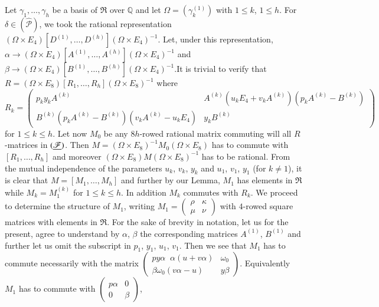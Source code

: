 Let $\gamma_{1},\ldots, \gamma_{h}$ be a basis of $\mathfrak{R}$ over
$\mathbb{Q}$ and let $\Omega=(\gamma^{(1)}_{k})$ with $1\leq k$,
$1\leq h$. For $\delta\in(\widehat{\mathscr{P}})$, we took the
rational representation $(\Omega\times
E_{4})[D^{(1)},\ldots,D^{(h)}](\Omega\times E_{4})^{-1}$. Let, under
this representation, $\alpha\to(\Omega\times
E_{4})[A^{(1)},\ldots,A^{(h)}](\Omega\times E_{4})^{-1}$ and 
$\beta\to (\Omega\times E_{4})[B^{(1)},\ldots,B^{(h)}](\Omega\times
E_{4})^{-1}$.\pageoriginale It is trivial to verify that $R=(\Omega\times
E_{8})[R_{1},\ldots,R_{h}](\Omega\times E_{8})^{-1}$ where
{\fontsize{10}{12}\selectfont
$$
R_{k}=
\begin{pmatrix}
p_{k}y_{k}A^{(k)} &
A^{(k)}(u_{k}E_{4}+v_{k}A^{(k)})(p_{k}A^{(k)}-B^{(k)})\\
B^{(k)}(p_{k}A^{(k)}-B^{(k)})(v_{k}A^{(k)}-u_{k}E_{4}) & y_{k}B^{(k)}
\end{pmatrix}
$$}\relax
for $1\leq k\leq h$. Let now $M_{0}$ be any $8h$-rowed rational matrix
commuting will all $R$-matrices in $(\underline{\mathscr{F}})$. Then
$M=(\Omega\times E_{8})^{-1}M_{0}(\Omega\times E_{8})$ has to commute
with $[R_{1},\ldots,R_{h}]$ and moreover $(\Omega\times
E_{8})M(\Omega\times E_{8})^{-1}$ has to be rational. From the mutual
independence of the parameters $u_{k}$, $v_{k}$, $y_{k}$ and $u_{1}$,
$v_{1}$, $y_{1}$ (for $k\neq 1$), it is clear that
$M=[M_{1},\ldots,M_{h}]$ and further by our Lemma, $M_{1}$ has
elements in $\mathfrak{R}$ while $M_{k}=M^{(k)}_{1}$ for $1\leq k\leq
h$. In addition $M_{k}$ commutes with $R_{k}$. We proceed to determine
the structure of $M_{1}$, writing $M_{1}=\left(\begin{smallmatrix}
  \rho &\kappa\\ \mu & \nu
\end{smallmatrix}\right)$ with $4$-rowed square matrices with elements
in $\mathfrak{R}$. For the sake of brevity in notation, let us for the
present, agree to understand by $\alpha$, $\beta$ the corresponding
matrices $A^{(1)}$, $B^{(1)}$ and further let us omit the subscript in
$p_{1}$, $y_{1}$, $u_{1}$, $v_{1}$. Then we see that $M_{1}$ has to
commute necessarily with the matrix $\left(\begin{smallmatrix}
  py\alpha \;\; \alpha(u+v\alpha) & \omega_{0}\\ \beta\omega_{0}(v\alpha-u)
  &  y\beta\end{smallmatrix}\right)$. Equivalently $M_{1}$ has to
  commute with $\left(\begin{smallmatrix} p\alpha & 0\\ 0 & \beta
  \end{smallmatrix}\right)$,
